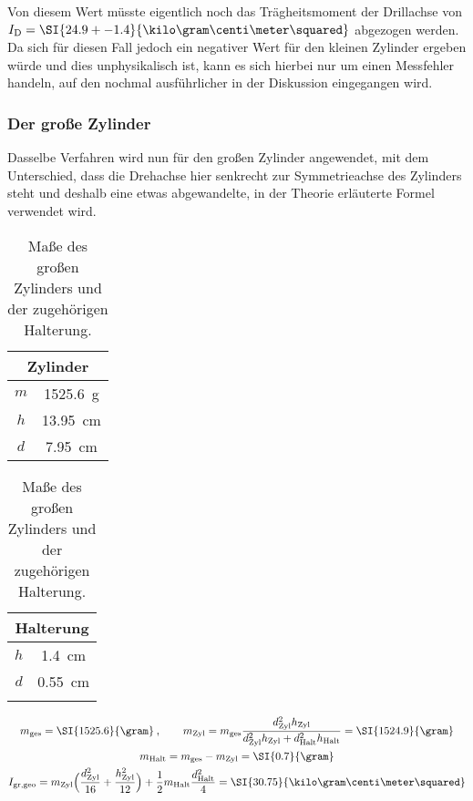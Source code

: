 Von diesem Wert müsste eigentlich noch das Trägheitsmoment der Drillachse von ${I_\text{D}=\SI{24.9+-1.4}{\kilo\gram\centi\meter\squared}}$ 
abgezogen werden. Da sich für diesen Fall jedoch ein negativer Wert für den kleinen Zylinder ergeben würde und dies 
unphysikalisch ist, kann es sich hierbei nur um einen Messfehler handeln, auf den nochmal ausführlicher in der Diskussion 
eingegangen wird. 

\FloatBarrier
\subsubsection{Der große Zylinder}

Dasselbe Verfahren wird nun für den großen Zylinder angewendet, mit dem Unterschied, dass die Drehachse hier senkrecht zur 
Symmetrieachse des Zylinders steht und deshalb eine etwas abgewandelte, in der Theorie erläuterte Formel verwendet wird. 

\begin{table}
    \centering
    \caption{Maße des großen Zylinders und der zugehörigen Halterung.}
    \label{tab:groZyl}
    \begin{tabular}{c c}
        \toprule
        \multicolumn{2}{c}{Zylinder}\\
        \midrule
        $m$ & \SI{1525.6}{\gram} \\
        $h$ & \SI{13.95}{\centi\meter} \\
        $d$ & \SI{7.95}{\centi\meter} \\
        \bottomrule
    \end{tabular}
    \qquad \qquad 
    \begin{tabular}{c c}
        \toprule
        \multicolumn{2}{c}{Halterung}\\
        \midrule
        $h$ & \SI{1.4}{\centi\meter} \\
        $d$ & \SI{0.55}{\centi\meter} \\ 
        \bottomrule
            \\
    \end{tabular}
\end{table}

\begin{gather}
    m_\text{ges}=\SI{1525.6}{\gram}\:, \qquad 
    m_\text{Zyl}=m_\text{ges}\frac{d_\text{Zyl}^2h_\text{Zyl}}{d_\text{Zyl}^2h_\text{Zyl}+d_\text{Halt}^2h_\text{Halt}}=\SI{1524.9}{\gram} \\
    m_\text{Halt} = m_\text{ges}-m_\text{Zyl}=\SI{0.7}{\gram} \\
    I_\text{gr,geo}=m_\text{Zyl} \Bigl( \frac{d_\text{Zyl}^2}{16} + \frac{h_\text{Zyl}^2}{12} \Bigr) 
        +\frac{1}{2}m_\text{Halt}\frac{d_\text{Halt}^2}{4}=\SI{30.75}{\kilo\gram\centi\meter\squared}
\end{gather}

